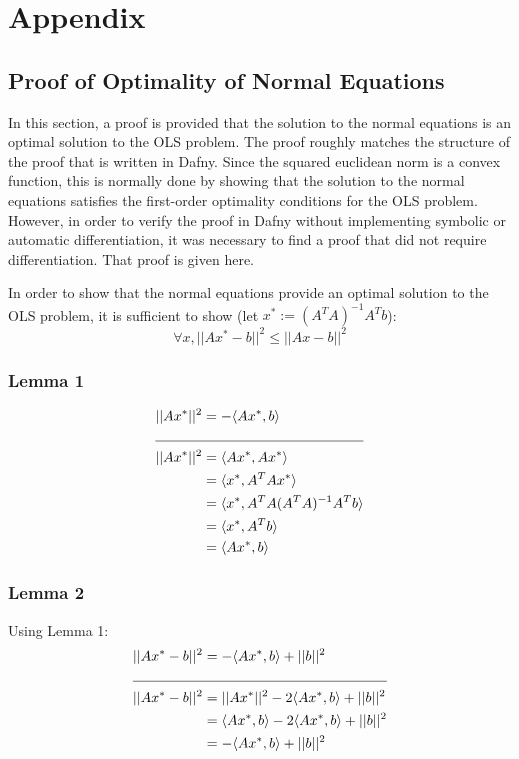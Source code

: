 \documentclass[12pt]{article}
\begin{document}
\section{Appendix}
\subsection{Proof of Optimality of Normal Equations}
\label{sec:mathproof}
In this section, a proof is provided that the solution to the normal equations is an optimal solution to the OLS problem. The proof roughly matches the structure of the proof that is written in Dafny. Since the squared euclidean norm is a convex function, this is normally done by showing that the solution to the normal equations satisfies the first-order optimality conditions for the OLS problem. However, in order to verify the proof in Dafny without implementing symbolic or automatic differentiation, it was necessary to find a proof that did not require differentiation. That proof is given here.

In order to show that the normal equations provide an optimal solution to the OLS problem, it is sufficient to show (let $x^* := (A^T A)^{-1} A^T b$):
$$\forall x, ||Ax^* - b||^2 \le ||Ax - b||^2$$

\subsubsection{Lemma 1}
\begin{align*}
||Ax^*||^2 &= -\langle Ax^*, b \rangle \\
\cline{1 - 2}
||Ax^*||^2 &= \langle Ax^*, Ax^* \rangle \\
 &= \langle x^*, A^T Ax^* \rangle \\
 &= \langle x^*, A^T A (A^T A)^{-1} A^T b \rangle \\
 &= \langle x^*, A^T b \rangle \\
 &= \langle Ax^*, b \rangle
\end{align*}

\subsubsection{Lemma 2}
Using Lemma 1:
\begin{align*}
||Ax^* - b||^2 &= -\langle Ax^*, b \rangle + ||b||^2 \\
\cline{1 - 2}
||Ax^* - b||^2 &= ||Ax^*||^2 - 2 \langle Ax^*, b \rangle + ||b||^2 \\
 &= \langle Ax^*, b \rangle - 2 \langle Ax^*, b \rangle + ||b||^2 \\
 &= -\langle Ax^*, b \rangle + ||b||^2
\end{align*}
\end{document}
